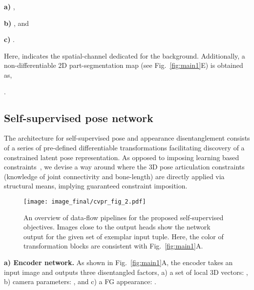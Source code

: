 \textbf{a)} 
, 



\textbf{b)} , and 

\textbf{c)}
. 

Here,  indicates the spatial-channel dedicated for the background. Additionally, a non-differentiable 2D part-segmentation map (see Fig.~\ref{fig:main1}{\color{red}E}) is obtained as,

. 


\subsection{Self-supervised pose network}\label{sec:3_2}
The architecture for self-supervised pose and appearance disentanglement consists of a series of pre-defined differentiable transformations facilitating discovery of a constrained latent pose representation. As opposed to imposing learning based constraints~\cite{habibie2019wild}, 
we devise a way around where the 3D pose articulation constraints (\ie knowledge of joint connectivity and bone-length) are directly applied via structural means, implying guaranteed constraint imposition. 



\begin{figure*}\begin{center}
    \vspace{-1mm}
	\texttt{[image: image\_final/cvpr\_fig\_2.pdf]}
	\vspace{-5.0mm}
	\caption{An overview of data-flow pipelines for the proposed self-supervised objectives. Images close to the output heads show the network output for the given set of exemplar input tuple. Here, the color of transformation blocks are consistent with Fig.~\ref{fig:main1}{\color{red}A}. 
	}
 	\label{fig:main2}    
    \vspace{-6mm}
\end{center}
\end{figure*}



\noindent
\textbf{a) Encoder network.} As shown in Fig.~\ref{fig:main1}{\color{red}A}, the encoder  takes an input image  and outputs three disentangled factors, a) a set of local 3D vectors: , b) camera parameters: , and c) a FG appearance: .


